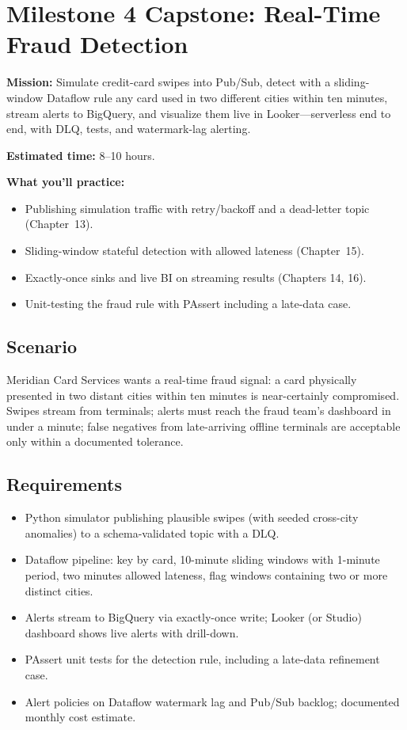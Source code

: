 \section{Milestone 4 Capstone: Real-Time Fraud Detection}\label{sec:ch16-capstone}

\begin{capstonebox}
\textbf{Mission:} Simulate credit-card swipes into Pub/Sub, detect with a sliding-window Dataflow rule any card used in two different cities within ten minutes, stream alerts to BigQuery, and visualize them live in Looker---serverless end to end, with DLQ, tests, and watermark-lag alerting.

\textbf{Estimated time:} 8--10 hours.

\textbf{What you'll practice:}
\begin{itemize}
    \item Publishing simulation traffic with retry/backoff and a dead-letter topic (Chapter~13).
    \item Sliding-window stateful detection with allowed lateness (Chapter~15).
    \item Exactly-once sinks and live BI on streaming results (Chapters 14, 16).
    \item Unit-testing the fraud rule with PAssert including a late-data case.
\end{itemize}
\end{capstonebox}

\subsection*{Scenario}
Meridian Card Services wants a real-time fraud signal: a card physically presented in two distant cities within ten minutes is near-certainly compromised. Swipes stream from terminals; alerts must reach the fraud team's dashboard in under a minute; false negatives from late-arriving offline terminals are acceptable only within a documented tolerance.

\subsection*{Requirements}
\begin{itemize}
    \item Python simulator publishing plausible swipes (with seeded cross-city anomalies) to a schema-validated topic with a DLQ.
    \item Dataflow pipeline: key by card, 10-minute sliding windows with 1-minute period, two minutes allowed lateness, flag windows containing two or more distinct cities.
    \item Alerts stream to BigQuery via exactly-once write; Looker (or Studio) dashboard shows live alerts with drill-down.
    \item PAssert unit tests for the detection rule, including a late-data refinement case.
    \item Alert policies on Dataflow watermark lag and Pub/Sub backlog; documented monthly cost estimate.
\end{itemize}

